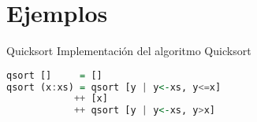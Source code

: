 \section{Ejemplos}

\begin{frame}[fragile]{Quicksort}
  Implementación del algoritmo Quicksort
  \begin{lstlisting}[language=haskell]
qsort []     = []
qsort (x:xs) = qsort [y | y<-xs, y<=x]
            ++ [x]
            ++ qsort [y | y<-xs, y>x]
  \end{lstlisting}
\end{frame}
